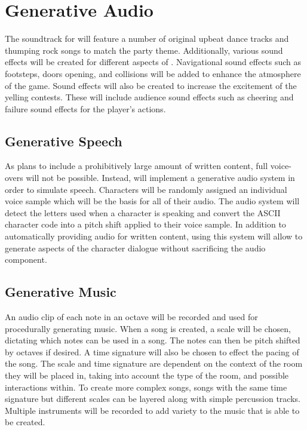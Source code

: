 \section{Generative Audio}
The soundtrack for \ourgame{} will feature a number of original upbeat dance tracks and thumping rock songs to match the party theme. Additionally, various sound effects will be created for different aspects of \ourgame{}. Navigational sound effects such as footsteps, doors opening, and collisions will be added to enhance the atmosphere of the game. Sound effects will also be created to increase the excitement of the yelling contests. These will include audience sound effects such as cheering and failure sound effects for the player's actions. 

\subsection{Generative Speech}
As \ourteam{} plans to include a prohibitively large amount of written content, full voice-overs will not be possible. Instead, \ourgame{} will implement a generative audio system in order to simulate speech. Characters will be randomly assigned an individual voice sample which will be the basis for all of their audio. The audio system will detect the letters used when a character is speaking and convert the ASCII character code into a pitch shift applied to their voice sample. In addition to automatically providing audio for written content, using this system will allow \ourteam{} to generate aspects of the character dialogue without sacrificing the audio component.

\subsection{Generative Music}
\label{sec:audio_generation}
An audio clip of each note in an octave will be recorded and used for procedurally generating music. When a song is created, a scale will be chosen, dictating which notes can  be used in a song. The notes can then be pitch shifted by octaves if desired. A time signature will also be chosen to effect the pacing of the song. The scale and time signature are dependent on the context of the room they will be placed in, taking into account the type of the room, and possible interactions within. To create more complex songs, songs with the same time signature but different scales can be layered along with simple percussion tracks. Multiple instruments will be recorded to add variety to the music that is able to be created.